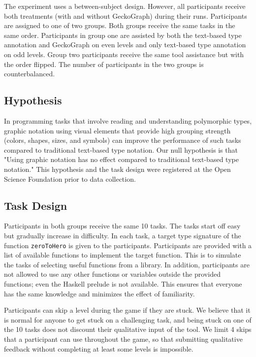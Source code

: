 The experiment uses a between-subject design. However, all participants receive both treatments (with and without GeckoGraph) during their runs.
Participants are assigned to one of two groups. Both groups receive the same tasks in the same order. Participants in group one are assisted by both the text-based type annotation and GeckoGraph on even levels and only text-based type annotation on odd levels. Group two participants receive the same tool assistance but with the order flipped. The number of participants in the two groups is counterbalanced.

\subsection{Hypothesis}
In programming tasks that involve reading and understanding polymorphic types, graphic notation using visual elements that provide high grouping strength (colors, shapes, sizes, and symbols) can improve the performance of such tasks compared to traditional text-based type notation. Our null hypothesis is that "Using graphic notation has no effect compared to traditional text-based type notation." This hypothesis and the task design were registered at the Open Science Foundation prior to data collection. 

\subsection{Task Design} \label{subsection:task}
Participants in both groups receive the same 10 tasks. The tasks start off easy but gradually increase in difficulty.  In each task, a target type signature of the function \texttt{zeroToHero} is given to the participants. Participants are provided with a list of available functions to implement the target function. This is to simulate the tasks of selecting useful functions from a library. In addition, participants are not allowed to use any other functions or variables outside the provided functions; even the Haskell prelude is not available. This ensures that everyone has the same knowledge and minimizes the effect of familiarity. 

Participants can skip a level during the game if they are stuck. We believe that it is normal for anyone to get stuck on a challenging task, and being stuck on one of the 10 tasks does not discount their qualitative input of the tool. We limit 4 skips that a participant can use throughout the game, so that submitting qualitative feedback without completing at least some levels is impossible. 

